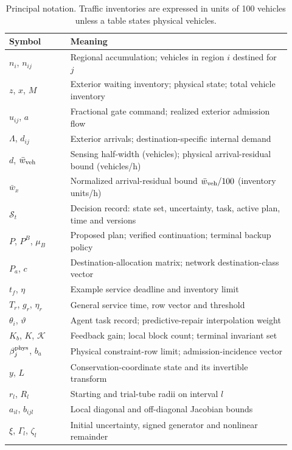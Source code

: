 \documentclass[journal,10pt]{IEEEtran}
\begin{document}
\begin{table}[!t]
\centering\small
\caption{Principal notation. Traffic inventories are expressed in units of
100 vehicles unless a table states physical vehicles.}
\label{tab:nomenclature}
\begin{tabular}{@{}p{0.20\linewidth}p{0.72\linewidth}@{}}
\toprule
Symbol & Meaning\\
\midrule
$n_i$, $n_{ij}$ & Regional accumulation; vehicles in region $i$ destined for $j$\\
$z$, $x$, $M$ & Exterior waiting inventory; physical state; total vehicle inventory\\
$u_{ij}$, $a$ & Fractional gate command; realized exterior admission flow\\
$\Lambda$, $d_{ij}$ & Exterior arrivals; destination-specific internal demand\\
$d$, $\bar w_{\rm veh}$ & Sensing half-width (vehicles); physical arrival-residual bound (vehicles/h)\\
$\bar w_x$ & Normalized arrival-residual bound $\bar w_{\rm veh}/100$ (inventory units/h)\\
$\mathcal S_t$ & Decision record: state set, uncertainty, task, active plan, time and versions\\
$P$, $P^B$, $\mu_B$ & Proposed plan; verified continuation; terminal backup policy\\
$P_a$, $c$ & Destination-allocation matrix; network destination-class vector\\
$t_f$, $\eta$ & Example service deadline and inventory limit\\
$T_r$, $g_r$, $\eta_r$ & General service time, row vector and threshold\\
$\theta_i$, $\vartheta$ & Agent task record; predictive-repair interpolation weight\\
$K_b$, $K$, $\mathcal K$ & Feedback gain; local block count; terminal invariant set\\
$\beta_j^{\rm phys}$, $b_a$ & Physical constraint-row limit; admission-incidence vector\\
$y$, $L$ & Conservation-coordinate state and its invertible transform\\
$r_l$, $R_l$ & Starting and trial-tube radii on interval $l$\\
$a_{il}$, $b_{ijl}$ & Local diagonal and off-diagonal Jacobian bounds\\
$\xi$, $\Gamma_l$, $\zeta_l$ & Initial uncertainty, signed generator and nonlinear remainder\\

\end{tabular}
\end{table}
\end{document}
